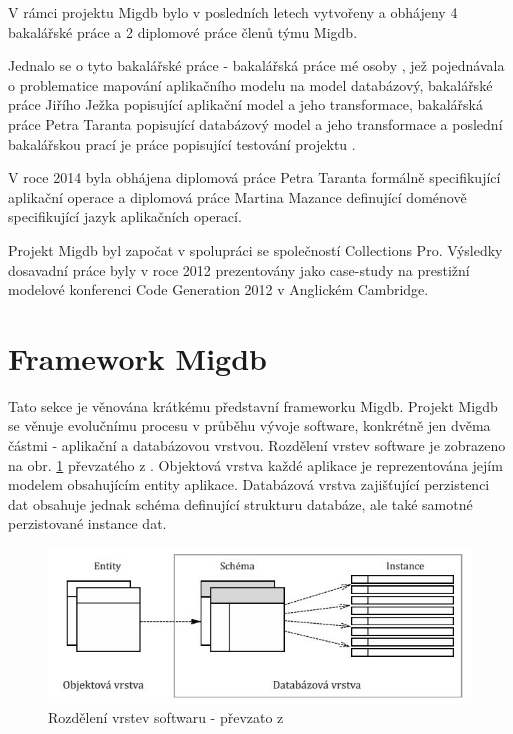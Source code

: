 \documentclass[11pt,twoside,a4paper]{book}
\begin{document}
V rámci projektu Migdb bylo v posledních letech vytvořeny a obhájeny 4
bakalářské práce a 2 diplomové práce členů týmu Migdb.

Jednalo se o tyto bakalářské práce - bakalářská práce mé osoby \cite{Lukes},
jež pojednávala o problematice mapování aplikačního modelu na model databázový,
bakalářské práce Jiřího Ježka \cite{Jezek} popisující aplikační model a jeho
transformace, bakalářská práce Petra Taranta \cite{Tarant_bp} popisující
databázový model a jeho transformace a poslední bakalářskou prací je práce
popisující testování projektu \cite{Luksch}.

V roce 2014 byla obhájena diplomová práce Petra Taranta \cite{Tarant_dip}
formálně specifikující aplikační operace a diplomová práce Martina Mazance
\cite{Mazanec} definující doménově specifikující jazyk aplikačních operací.

Projekt Migdb byl započat v spolupráci se společností Collections Pro. Výsledky
dosavadní práce byly v roce 2012 prezentovány jako case-study na prestižní
modelové konferenci Code Generation 2012 \cite{Cambridge} v Anglickém Cambridge.%

\section{Framework Migdb}
	
Tato sekce je věnována krátkému představní frameworku Migdb. Projekt Migdb se
věnuje evolučnímu procesu v průběhu vývoje software, konkrétně jen dvěma částmi
- aplikační a databázovou vrstvou. Rozdělení vrstev software je zobrazeno na
obr. \ref{fig:mazanma:framework} převzatého z \cite{Mazanec}.
Objektová vrstva každé aplikace je reprezentována jejím modelem obsahujícím
entity aplikace. Databázová vrstva zajišťující perzistenci dat obsahuje jednak
schéma definující strukturu databáze, ale také samotné perzistované instance dat.

\begin{figure}[H]
\begin{center}
\includegraphics[width=15cm]{figures/framework_structura}
\caption{Rozdělení vrstev softwaru - převzato z \cite{Mazanec}}
\label{fig:mazanma:framework}
\end{center}
\end{figure}
%
\end{document}
